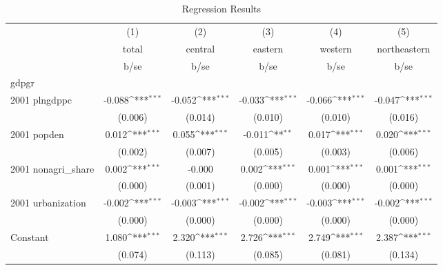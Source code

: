\begin{table}[htbp]\centering
\def\sym#1{\ifmmode^{#1}\else\(^{#1}\)\fi}
\caption{Regression Results}
\begin{tabular}{l*{5}{c}}
\hline\hline
                    &\multicolumn{1}{c}{(1)}&\multicolumn{1}{c}{(2)}&\multicolumn{1}{c}{(3)}&\multicolumn{1}{c}{(4)}&\multicolumn{1}{c}{(5)}\\
                    &\multicolumn{1}{c}{total}&\multicolumn{1}{c}{central}&\multicolumn{1}{c}{eastern}&\multicolumn{1}{c}{western}&\multicolumn{1}{c}{northeastern}\\
                    &        b/se         &        b/se         &        b/se         &        b/se         &        b/se         \\
\hline
gdpgr               &                     &                     &                     &                     &                     \\
2001 plngdppc       &      -0.088\sym{***}&      -0.052\sym{***}&      -0.033\sym{***}&      -0.066\sym{***}&      -0.047\sym{***}\\
                    &     (0.006)         &     (0.014)         &     (0.010)         &     (0.010)         &     (0.016)         \\
2001 popden         &       0.012\sym{***}&       0.055\sym{***}&      -0.011\sym{**} &       0.017\sym{***}&       0.020\sym{***}\\
                    &     (0.002)         &     (0.007)         &     (0.005)         &     (0.003)         &     (0.006)         \\
2001 nonagri\_share  &       0.002\sym{***}&      -0.000         &       0.002\sym{***}&       0.001\sym{***}&       0.001\sym{***}\\
                    &     (0.000)         &     (0.001)         &     (0.000)         &     (0.000)         &     (0.000)         \\
2001 urbanization   &      -0.002\sym{***}&      -0.003\sym{***}&      -0.002\sym{***}&      -0.003\sym{***}&      -0.002\sym{***}\\
                    &     (0.000)         &     (0.000)         &     (0.000)         &     (0.000)         &     (0.000)         \\
Constant            &       1.080\sym{***}&       2.320\sym{***}&       2.726\sym{***}&       2.749\sym{***}&       2.387\sym{***}\\
                    &     (0.074)         &     (0.113)         &     (0.085)         &     (0.081)         &     (0.134)         \\

\end{tabular}
\end{table}
